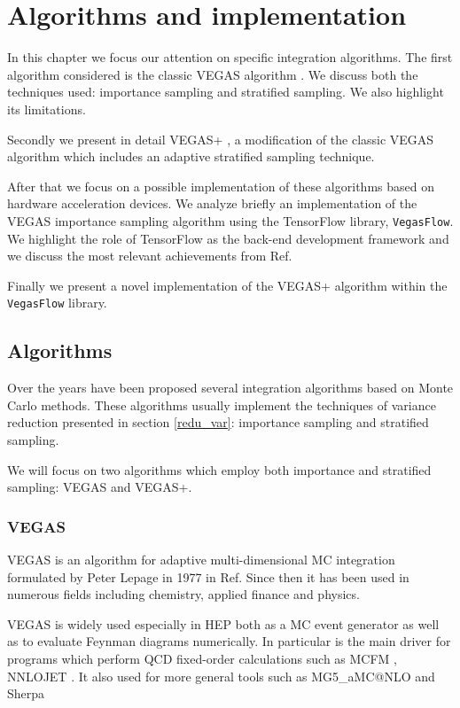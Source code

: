 \documentclass[../main/main.tex]{subfiles}
\begin{document}
\chapter[Algorithms and implementation]{Algorithms and implementation}
In this chapter we focus our attention on specific integration algorithms. 
The first algorithm considered is the classic VEGAS algorithm \cite{Lepage:1977sw}. We discuss both the techniques used: importance sampling and stratified sampling. We also highlight its limitations.

Secondly we present in detail VEGAS+ \cite{Lepage:2020tgj}, a modification of the classic VEGAS algorithm which includes an adaptive stratified sampling technique.

After that we focus on a possible implementation of these algorithms based on hardware acceleration devices.
We analyze briefly an implementation of the VEGAS importance sampling algorithm using the TensorFlow library, \texttt{VegasFlow}. We highlight the role of TensorFlow as the back-end development framework and we discuss the most relevant achievements from Ref\cite{Carrazza:2020rdn}.

Finally we present a novel implementation of the VEGAS+ algorithm within the \texttt{VegasFlow} library. 

 
	
\section{Algorithms}
Over the years have been proposed several integration algorithms based on Monte Carlo methods.
These algorithms usually implement the techniques of variance reduction presented in section \ref{redu_var}: importance sampling and stratified sampling.

We will focus on two algorithms which employ both importance and stratified sampling: VEGAS and VEGAS+.

\subsection{VEGAS}
VEGAS is an algorithm for adaptive multi-dimensional MC integration formulated by Peter Lepage in 1977 in Ref\cite{Lepage:1977sw}.
Since then it has been used in numerous fields including chemistry, applied finance and physics.

VEGAS is widely used especially in HEP both as a MC event generator as well as to evaluate Feynman diagrams numerically.
In particular is the main driver for programs which perform QCD fixed-order calculations such as MCFM \cite{Campbell:2015qma, Campbell:2019dru}, NNLOJET \cite{Gehrmann:2018szu}. It also used for more general tools such as MG5\_aMC@NLO \cite{Alwall:2014hca} and Sherpa \cite{Gleisberg:2008ta} 
 
\end{document}
